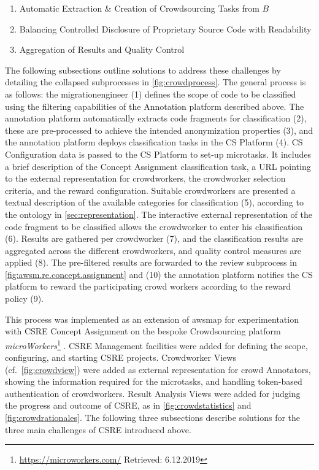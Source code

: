 \begin{enumerate}
\def\labelenumi{\arabic{enumi}.}
\tightlist
\item
  Automatic Extraction \& Creation of \gls{Crowdsourcing} Tasks from \(B\)
\item
  Balancing Controlled Disclosure of Proprietary Source Code with Readability
\item
  Aggregation of Results and Quality Control
\end{enumerate}

The following subsections outline solutions to address these challenges by detailing the collapsed subprocesses in \cref{fig:crowdprocess}.
The general process is as follows: the \gls{migrationengineer} (1) defines the scope of code to be classified using the filtering capabilities of the Annotation platform described above.
The annotation platform automatically extracts code fragments for classification (2), these are  pre-processed to achieve the intended anonymization properties (3), and the annotation platform deploys classification tasks in the CS Platform (4).
CS Configuration data is passed to the CS Platform to set-up microtasks.
It includes a brief description of the \gls{Concept Assignment} classification task, a URL pointing to the external representation for crowdworkers, the crowdworker selection criteria, and the reward configuration.
Suitable crowdworkers are presented a textual description of the available categories for classification (5), according to the ontology in \cref{sec:representation}.
The interactive external representation of the code fragment to be classified allows the crowdworker to enter his classification (6).
Results are gathered per crowdworker (7), and the classification results are aggregated across the different crowdworkers, and quality control measures are applied (8).
The pre-filtered results are forwarded to the review subprocess in \cref{fig:awsm.re.concept.assignment} and (10) the annotation platform notifies the CS platform to reward the participating crowd workers according to the reward policy (9).

This process was implemented as an extension of \gls{awsmap} for experimentation with CSRE \gls{Concept Assignment} on the bespoke \gls{Crowdsourcing} platform \emph{microWorkers}\footnote{\url{https://microworkers.com/} Retrieved: 6.12.2019} \autocite{Heil2018CSRE,Heil2019CSRECCIS}.
CSRE Management facilities were added for defining the scope, configuring, and starting CSRE projects.
Crowdworker Views (cf.~\cref{fig:crowdview}) were added as external representation for crowd Annotators, showing the information required for the microtasks, and handling token-based authentication of crowdworkers.
Result Analysis Views were added for judging the progress and outcome of CSRE, as in \cref{fig:crowdstatistics} and \cref{fig:crowdrationales}.
The following three subsections describe solutions for the three main challenges of CSRE introduced above.


